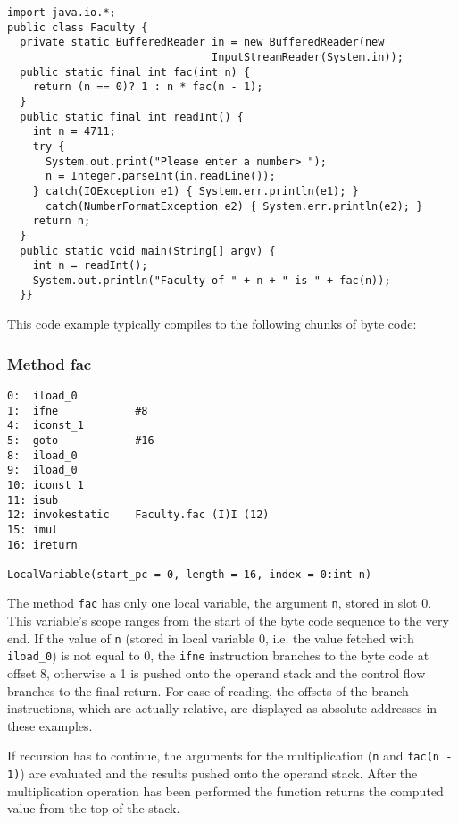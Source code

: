\documentclass[12pt,twoside]{article}
\begin{document}
{\small \begin{verbatim}
import java.io.*;
public class Faculty {
  private static BufferedReader in = new BufferedReader(new
                                InputStreamReader(System.in));
  public static final int fac(int n) {
    return (n == 0)? 1 : n * fac(n - 1);
  }
  public static final int readInt() {
    int n = 4711;
    try {
      System.out.print("Please enter a number> ");
      n = Integer.parseInt(in.readLine());
    } catch(IOException e1) { System.err.println(e1); }
      catch(NumberFormatException e2) { System.err.println(e2); }
    return n;
  }
  public static void main(String[] argv) {
    int n = readInt();
    System.out.println("Faculty of " + n + " is " + fac(n));
  }}
\end{verbatim}}

This code example  typically compiles to the following  chunks of byte
code:

\subsubsection{Method fac}

{\small \begin{verbatim}
0:  iload_0
1:  ifne            #8
4:  iconst_1
5:  goto            #16
8:  iload_0
9:  iload_0
10: iconst_1
11: isub
12: invokestatic    Faculty.fac (I)I (12)
15: imul
16: ireturn

LocalVariable(start_pc = 0, length = 16, index = 0:int n)
\end{verbatim}}

The  method \texttt{fac}  has only  one local  variable,  the argument
\texttt{n}, stored in  slot 0.  This variable's scope  ranges from the
start of  the byte  code sequence to  the very  end.  If the  value of
\texttt{n} (stored  in local variable  0, i.e. the value  fetched with
\texttt{iload\_0}) is  not equal  to 0, the  \texttt{ifne} instruction
branches to  the byte code at offset  8, otherwise a 1  is pushed onto
the operand stack  and the control flow branches  to the final return.
For ease of reading, the offsets of the branch instructions, which are
actually   relative,  are displayed  as  absolute  addresses in  these
examples.

If  recursion has to  continue, the  arguments for  the multiplication
(\texttt{n}  and \texttt{fac(n -  1)}) are  evaluated and  the results
pushed onto the operand stack.  After the multiplication operation has
been performed the function returns the computed value from the top of
the stack.
\end{document}
